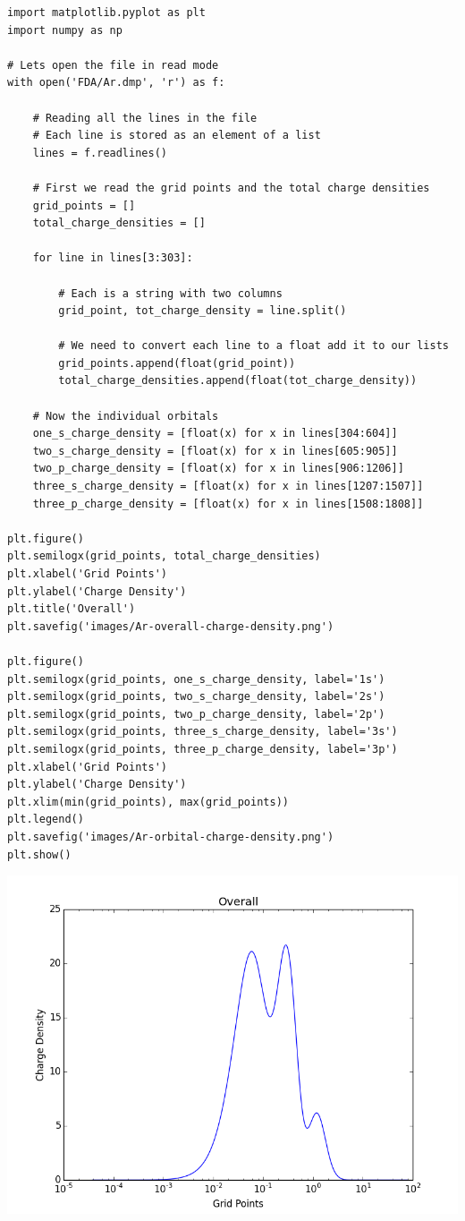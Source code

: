 \documentclass[11pt]{article}
\begin{document}
\begin{verbatim}
import matplotlib.pyplot as plt
import numpy as np

# Lets open the file in read mode
with open('FDA/Ar.dmp', 'r') as f:

    # Reading all the lines in the file
    # Each line is stored as an element of a list
    lines = f.readlines()

    # First we read the grid points and the total charge densities
    grid_points = []
    total_charge_densities = []

    for line in lines[3:303]:

        # Each is a string with two columns
        grid_point, tot_charge_density = line.split()

        # We need to convert each line to a float add it to our lists
        grid_points.append(float(grid_point))
        total_charge_densities.append(float(tot_charge_density))

    # Now the individual orbitals
    one_s_charge_density = [float(x) for x in lines[304:604]]
    two_s_charge_density = [float(x) for x in lines[605:905]]  
    two_p_charge_density = [float(x) for x in lines[906:1206]]
    three_s_charge_density = [float(x) for x in lines[1207:1507]]
    three_p_charge_density = [float(x) for x in lines[1508:1808]]
  
plt.figure()
plt.semilogx(grid_points, total_charge_densities)
plt.xlabel('Grid Points')
plt.ylabel('Charge Density')
plt.title('Overall')
plt.savefig('images/Ar-overall-charge-density.png')

plt.figure()
plt.semilogx(grid_points, one_s_charge_density, label='1s')
plt.semilogx(grid_points, two_s_charge_density, label='2s')
plt.semilogx(grid_points, two_p_charge_density, label='2p')
plt.semilogx(grid_points, three_s_charge_density, label='3s')
plt.semilogx(grid_points, three_p_charge_density, label='3p')
plt.xlabel('Grid Points')
plt.ylabel('Charge Density')
plt.xlim(min(grid_points), max(grid_points))
plt.legend()
plt.savefig('images/Ar-orbital-charge-density.png')
plt.show()
\end{verbatim}

\includegraphics[width=.9\linewidth]{./images/Ar-overall-charge-density.png}
\end{document}
